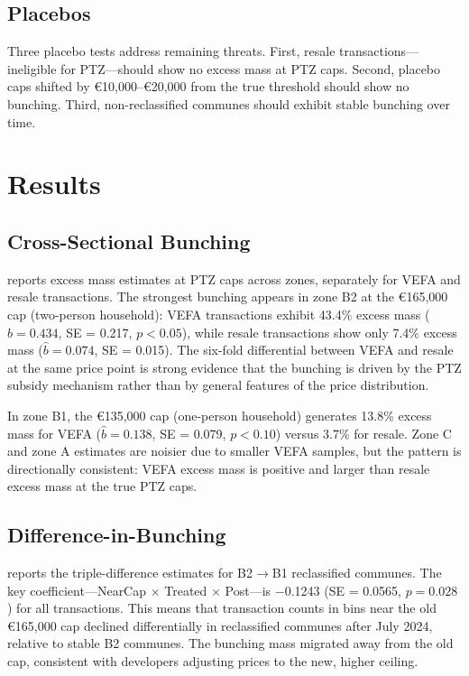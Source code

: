\documentclass[12pt]{article}
\begin{document}
\subsection{Placebos}

Three placebo tests address remaining threats. First, resale transactions---ineligible for PTZ---should show no excess mass at PTZ caps. Second, placebo caps shifted by \euro10,000--\euro20,000 from the true threshold should show no bunching. Third, non-reclassified communes should exhibit stable bunching over time.

\section{Results}
\label{sec:results}

\subsection{Cross-Sectional Bunching}



 reports excess mass estimates at PTZ caps across zones, separately for VEFA and resale transactions. The strongest bunching appears in zone B2 at the \euro165,000 cap (two-person household): VEFA transactions exhibit 43.4\% excess mass ($\hat{b} = 0.434$, SE = 0.217, $p < 0.05$), while resale transactions show only 7.4\% excess mass ($\hat{b} = 0.074$, SE = 0.015). The six-fold differential between VEFA and resale at the same price point is strong evidence that the bunching is driven by the PTZ subsidy mechanism rather than by general features of the price distribution.

In zone B1, the \euro135,000 cap (one-person household) generates 13.8\% excess mass for VEFA ($\hat{b} = 0.138$, SE = 0.079, $p < 0.10$) versus 3.7\% for resale. Zone C and zone A estimates are noisier due to smaller VEFA samples, but the pattern is directionally consistent: VEFA excess mass is positive and larger than resale excess mass at the true PTZ caps.

\subsection{Difference-in-Bunching}



 reports the triple-difference estimates for B2$\to$B1 reclassified communes. The key coefficient---NearCap $\times$ Treated $\times$ Post---is $-$0.1243 (SE = 0.0565, $p = 0.028$) for all transactions. This means that transaction counts in bins near the old \euro165,000 cap declined differentially in reclassified communes after July 2024, relative to stable B2 communes. The bunching mass migrated away from the old cap, consistent with developers adjusting prices to the new, higher ceiling.
\end{document}
